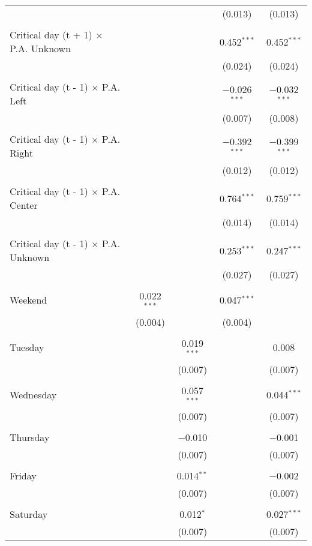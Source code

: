 \documentclass[
]{article}
\begin{document}
\begin{table}[!htbp]
{\begin{tabular}{@{\extracolsep{5pt}}lcccc}
  &  &  & (0.013) & (0.013) \\ 
  & & & & \\ 
 Critical day (t + 1) $\times$ P.A. Unknown &  &  & 0.452$^{***}$ & 0.452$^{***}$ \\ 
  &  &  & (0.024) & (0.024) \\ 
  & & & & \\ 
 Critical day (t - 1) $\times$ P.A. Left &  &  & $-$0.026$^{***}$ & $-$0.032$^{***}$ \\ 
  &  &  & (0.007) & (0.008) \\ 
  & & & & \\ 
 Critical day (t - 1) $\times$ P.A. Right &  &  & $-$0.392$^{***}$ & $-$0.399$^{***}$ \\ 
  &  &  & (0.012) & (0.012) \\ 
  & & & & \\ 
 Critical day (t - 1) $\times$ P.A. Center &  &  & 0.764$^{***}$ & 0.759$^{***}$ \\ 
  &  &  & (0.014) & (0.014) \\ 
  & & & & \\ 
 Critical day (t - 1) $\times$ P.A. Unknown &  &  & 0.253$^{***}$ & 0.247$^{***}$ \\ 
  &  &  & (0.027) & (0.027) \\ 
  & & & & \\ 
 Weekend & 0.022$^{***}$ &  & 0.047$^{***}$ &  \\ 
  & (0.004) &  & (0.004) &  \\ 
  & & & & \\ 
 Tuesday &  & 0.019$^{***}$ &  & 0.008 \\ 
  &  & (0.007) &  & (0.007) \\ 
  & & & & \\ 
 Wednesday &  & 0.057$^{***}$ &  & 0.044$^{***}$ \\ 
  &  & (0.007) &  & (0.007) \\ 
  & & & & \\ 
 Thursday &  & $-$0.010 &  & $-$0.001 \\ 
  &  & (0.007) &  & (0.007) \\ 
  & & & & \\ 
 Friday &  & 0.014$^{**}$ &  & $-$0.002 \\ 
  &  & (0.007) &  & (0.007) \\ 
  & & & & \\ 
 Saturday &  & 0.012$^{*}$ &  & 0.027$^{***}$ \\ 
  &  & (0.007) &  & (0.007) \\ 

\end{tabular}}
\end{table}
\end{document}
